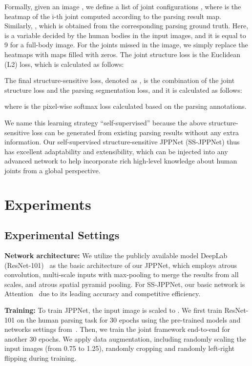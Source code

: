\documentclass[10pt,journal,compsoc]{IEEEtran}
\begin{document}
Formally, given an image , we define a list of joint configurations , where  is the heatmap of the i-th joint computed according to the parsing result map. Similarly, , which is obtained from the corresponding parsing ground truth. Here,  is a variable decided by the human bodies in the input images, and it is equal to 9 for a full-body image. For the joints missed in the image, we simply replace the heatmaps with maps filled with zeros. The joint structure loss is the Euclidean (L2) loss, which is calculated as follows:

The final structure-sensitive loss, denoted as , is the combination of the joint structure loss and the parsing segmentation loss, and it is calculated as follows:

where  is the pixel-wise softmax loss calculated based on the parsing annotations.

We name this learning strategy ``self-supervised'' because the above structure-sensitive loss can be generated from existing parsing results without any extra information. Our self-supervised structure-sensitive JPPNet (SS-JPPNet) thus has excellent adaptability and extensibility, which can be injected into any advanced network to help incorporate rich high-level knowledge about human joints from a global perspective. 







\section{Experiments}
\subsection{Experimental Settings}
\textbf{Network architecture: }
We utilize the publicly available model DeepLab (ResNet-101)~\cite{chen2016deeplab} as the basic architecture of our JPPNet, which employs atrous convolution, multi-scale inputs with max-pooling to merge the results from all scales, and atrous spatial pyramid pooling. For SS-JPPNet, our basic network is Attention~\cite{chen2015attention} due to its leading accuracy and competitive efficiency.

\textbf{Training: }
To train JPPNet, the input image is scaled to . We first train ResNet-101 on the human parsing task for 30 epochs using the pre-trained models and networks settings from~\cite{chen2016deeplab}. Then, we train the joint framework end-to-end for another 30 epochs. We apply data augmentation, including randomly scaling the input images (from 0.75 to 1.25), randomly cropping and randomly left-right flipping during training.
\end{document}
